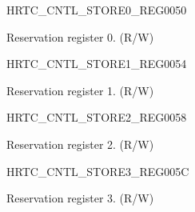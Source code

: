 \begin{register}{H}{RTC\_CNTL\_STORE0\_REG}{\hexprefix{}0050}\label{regdesc:RTCCNTLSTORE0REG}
%
\regnewline%
\begin{regdesc}\begin{reglist}
\label{fielddesc:RTCCNTLRTCSCRATCH0}\item [RTC\_CNTL\_RTC\_SCRATCH0] Reservation register 0. (R/W)
\end{reglist}\end{regdesc}
\end{register}


\begin{register}{H}{RTC\_CNTL\_STORE1\_REG}{\hexprefix{}0054}\label{regdesc:RTCCNTLSTORE1REG}
%
\regnewline%
\begin{regdesc}\begin{reglist}
\label{fielddesc:RTCCNTLRTCSCRATCH1}\item [RTC\_CNTL\_RTC\_SCRATCH1] Reservation register 1. (R/W)
\end{reglist}\end{regdesc}
\end{register}


\begin{register}{H}{RTC\_CNTL\_STORE2\_REG}{\hexprefix{}0058}\label{regdesc:RTCCNTLSTORE2REG}
%
\regnewline%
\begin{regdesc}\begin{reglist}
\label{fielddesc:RTCCNTLRTCSCRATCH2}\item [RTC\_CNTL\_RTC\_SCRATCH2] Reservation register 2. (R/W)
\end{reglist}\end{regdesc}
\end{register}


\begin{register}{H}{RTC\_CNTL\_STORE3\_REG}{\hexprefix{}005C}\label{regdesc:RTCCNTLSTORE3REG}
%
\regnewline%
\begin{regdesc}\begin{reglist}
\label{fielddesc:RTCCNTLRTCSCRATCH3}\item [RTC\_CNTL\_RTC\_SCRATCH3] Reservation register 3. (R/W)
\end{reglist}\end{regdesc}
\end{register}


